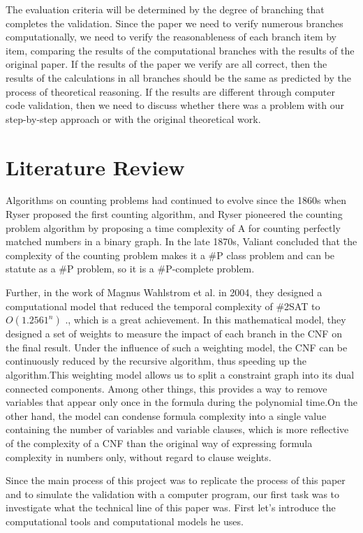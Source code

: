 \documentclass{sigchi}
\begin{document}
The evaluation criteria will be determined by the degree of branching that completes the validation. Since the paper we need to verify numerous branches computationally, we need to verify the reasonableness of each branch item by item, comparing the results of the computational branches with the results of the original paper. If the results of the paper we verify are all correct, then the results of the calculations in all branches should be the same as predicted by the process of theoretical reasoning. If the results are different through computer code validation, then we need to discuss whether there was a problem with our step-by-step approach or with the original theoretical work.

\section{Literature Review}
Algorithms on counting problems had continued to evolve since the 1860s when Ryser proposed the first counting algorithm\cite{10.1017/s0013091500011299}, and Ryser pioneered the counting problem algorithm by proposing a time complexity of A for counting perfectly matched numbers in a binary graph. In the late 1870s, Valiant concluded that the complexity of the counting problem makes it a \#P class problem and can be statute as a \#P problem, so it is a \#P-complete problem\cite{10.1016/0304-3975(79)90044-6}.

Further, in the work of Magnus Wahlstrom et al. in 2004, they designed a computational model that reduced the temporal complexity of \#2SAT to  $ O\left ( 1.2561^{n} \right )$ \cite{10.1016/j.tcs.2004.10.037}., which is a great achievement. In this mathematical model, they designed a set of weights to measure the impact of each branch in the CNF on the final result. Under the influence of such a weighting model, the CNF can be continuously reduced by the recursive algorithm, thus speeding up the algorithm.This weighting model allows us to split a constraint graph into its dual connected components. Among other things, this provides a way to remove variables that appear only once in the formula during the polynomial time.On the other hand, the model can condense formula complexity into a single value containing the number of variables and variable clauses, which is more reflective of the complexity of a CNF than the original way of expressing formula complexity in numbers only, without regard to clause weights.

Since the main process of this project was to replicate the process of this paper and to simulate the validation with a computer program, our first task was to investigate what the technical line of this paper was. First let's introduce the computational tools and computational models he uses.
\end{document}

